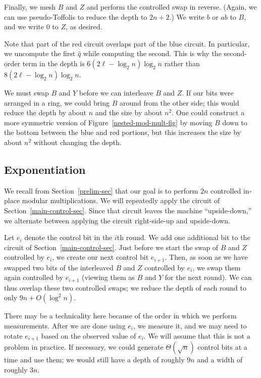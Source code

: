 \documentclass{article} %
\begin{document}
Finally, we mesh $B$ and $Z$ and perform the controlled swap
in reverse.  (Again, we can use pseudo-Toffolis to reduce the
depth to $2n+2$.)  We write $b$ or $ab$ to $B$, and we write $0$
to $Z$, as desired.

Note that part of the red circuit overlaps part of the blue
circuit.  In particular, we uncompute the first $\hat{q}$
while computing the second.  This is why the second-order
term in the depth is $6 (2\ell -\log_2 n)\log_2 n$ rather than
$8 (2\ell -\log_2 n)\log_2 n$.

We must swap $B$ and $Y$ before we can interleave
$B$ and $Z$.  If our bits were arranged in a ring, we could
bring $B$ around from the other side; this would reduce
the depth by about $n$ and the size by about $n^2$.  One
could construct a more symmetric version of
Figure~\ref{nested-mod-mult-fig} by moving $B$ down to the bottom
between the blue and red portions, but this increases the
size by about $n^2$ without changing the depth.

\subsection{Exponentiation}
\label{main-exp-sec}

We recall from Section~\ref{prelim-sec} that our goal is to
perform $2n$ controlled in-place modular multiplications.  We
will repeatedly apply the circuit of Section~\ref{main-control-sec}.
Since that circuit leaves the machine ``upside-down,'' we alternate
between applying the circuit right-side-up and upside-down.

Let $e_i$ denote the control bit in the $i$th round.  We add one
additional bit to the circuit of Section~\ref{main-control-sec}.
Just before we start the swap of $B$ and $Z$ controlled by $e_i$, we
create our next control bit $e_{i+1}$.  Then, as soon as we have
swapped two bits of the interleaved $B$ and $Z$ controlled by
$e_i$, we swap them again controlled by $e_{i+1}$ (viewing them
as $B$ and $Y$ for the next round).  We can thus overlap these
two controlled swaps; we reduce the depth of each round to only
$9n + O(\log^2 n)$.

There may be a technicality here because of the order in which we
perform measurements.  After we are done using $e_i$, we measure
it, and we may need to rotate $e_{i+1}$ based on the observed
value of $e_i$.  We will assume that this is not a problem in
practice.  If necessary, we could generate $\Theta(\sqrt{n})$
control bits at a time and use them; we would still have a
depth of roughly $9n$ and a width of roughly $3n$.
\end{document}
